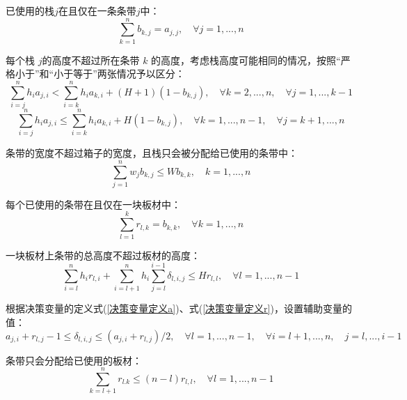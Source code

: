 \documentclass[bwprint]{gmcmthesis}
\begin{document}
已使用的栈$j$在且仅在一条条带$j$中：
\begin{equation}
    \sum_{k=1}^{n}  b_{k,j} =a_{j,j},\quad \forall j=1,...,n  \label{栈精确排在条带}
\end{equation}

每个栈 $j$的高度不超过所在条带 $k$ 的高度，考虑栈高度可能相同的情况，按照“严格小于”和“小于等于”两张情况予以区分：
\begin{equation}
    \sum_{i=j}^{n} h_ia_{j,i}<\sum_{i=k}^n h_i a_{k,i}+(H+1)(1-b_{k,j}),\quad  \forall  k=2,...,n,\quad  \forall j=1,...,k-1 \label{严格小于的高度限制}
\end{equation}
\begin{equation}
    \sum_{i=j}^{n} h_ia_{j,i} \le \sum_{i=k}^n h_i a_{k,i}+H(1-b_{k,j}), \quad  \forall k=1,...,n-1, \quad \forall j=k+1,...,n \label{小于等于的高度限制}
\end{equation}

条带的宽度不超过箱子的宽度，且栈只会被分配给已使用的条带中：
\begin{equation}
    \sum_{j=1}^{n} w_j b_{k,j} \le W b_{k,k}, \quad k=1,...,n \label{宽度限制}
\end{equation}

每个已使用的条带在且仅在一块板材中：
\begin{equation}
    \sum_{l=1}^{k} r_{l,k} = b_{k,k}, \quad \forall k=1,...,n \label{条带精准打包}
\end{equation}

一块板材上条带的总高度不超过板材的高度：
\begin{equation}
    \sum_{i=l}^{n} h_i r_{l,i} +\sum_{i=l+1}^{n} h_i \sum_{j=l}^{i-1} \delta_{l,i,j} \le H r_{l,l}, \quad \forall l=1,...,n-1 \label{板材高度}
\end{equation}

根据决策变量的定义式(\ref{决策变量定义a})、式(\ref{决策变量定义r})，设置辅助变量的值：
\begin{equation}
    a_{j,i}+r_{l,j}-1 \le \delta_{l,i,j} \le (a_{j,i}+r_{l,j})/2, \quad \forall l=1,...,n-1,\quad \forall i=l+1,...,n,\quad j=l,...,i-1 \label{决策变量相关}
\end{equation}

条带只会分配给已使用的板材：
\begin{equation}
    \sum_{k=l+1}^{n} r_{l.k} \le (n-l)r_{l,l}, \quad \forall l=1,...,n-1 \label{未使用板材无条带}
\end{equation}
\end{document}
